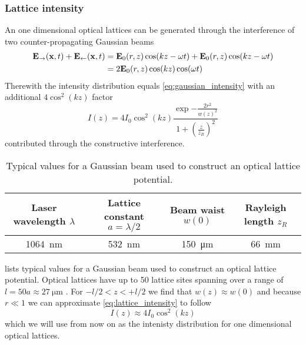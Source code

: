 \subsubsection{Lattice intensity}

An one dimensional optical lattices can be generated through the interference
of two counter-propagating Gaussian beams
\begin{align*}
  \vb{E}_\rightarrow(\vb{x},t)+\vb{E}_\leftarrow(\vb{x},t)
  &=
  \vb{E}_0(r,z)\cos(kz-\omega t)+\vb{E}_0(r,z)\cos(kz-\omega t)\\
  &=
  2\vb{E}_0(r,z)\cos(kz)\cos(\omega t)
\end{align*}
Therewith the intensity distribution equals
\cref{eq:gaussian_intensity} with an additional $4\cos^2(kz)$ factor
\begin{equation}
  I(z)
  =
  4I_0\cos^2(kz)
  \frac{\exp{-\frac{2r^2}{w(z)^2}}}{1+\left(\frac{z}{z_R}\right)^2}
  \label{eq:lattice_intensity}
\end{equation}
contributed through the constructive interference.

\begin{table}[h]
  \centering
  \begin{tabular}{|c|c|c|c|}
    \hline
    Laser wavelength $\lambda$ &
    Lattice constant $a=\lambda/2$ &
    Beam waist $w(0)$ &
    Rayleigh length $z_R$ \\
    \hline
    \SI{1064}{\nano\meter} &
    \SI{532}{\nano\meter} &
    \SI{150}{\micro\meter} &
    \SI{66}{\milli\meter} \\
    \hline
  \end{tabular}
  \captionsetup{width=.8\textwidth}
  \caption{Typical values for a Gaussian beam used to construct an optical
    lattice potential.}
  \label{tab:gaussian_beam_lattice}
\end{table}

 lists typical values for a Gaussian beam
used to construct an optical lattice potential. Optical lattices have up to
50 lattice sites spanning over a range of $l=50a\approx\SI{27}{\micro\meter}$
\cite{Rom2009}. For $-l/2<z<+l/2$ we find that $w(z)\approx w(0)$ and because
$r\ll1$ we can approximate \cref{eq:lattice_intensity} to follow
\begin{equation}
  I(z)
  \approx
  4I_0\cos^2(kz)
  \label{eq:gaussian_intensity_approx}
\end{equation}
which we will use from now on as the intenisty distribution for one
dimensional optical lattices.

